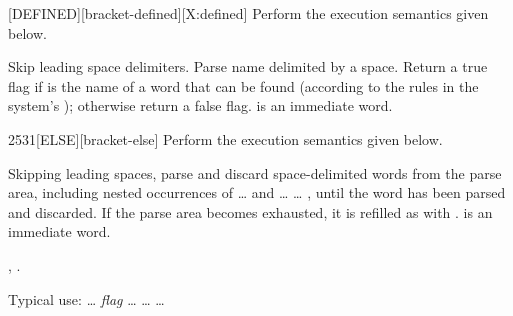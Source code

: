 
\begin{worddef}{}{[DEFINED]}[bracket-defined][X:defined]
\compile
	Perform the execution semantics given below.

\execute

	Skip leading space delimiters.  Parse name delimited by a space.
	Return a true flag if  is the name of a word that can
	be found (according to the rules in the system's );
	otherwise return a false flag.
	\word{[DEFINED]} is an immediate word.

	\begin{implement} %
		\word{:} \word{[DEFINED]}      \word{;} 
	\end{implement}
\end{worddef}


\begin{worddef}{2531}{[ELSE]}[bracket-else]
\compile
	Perform the execution semantics given below.

\execute

	Skipping leading spaces, parse and discard space-delimited words
	from the parse area, including nested occurrences of \word{[IF]}
	{\ldots} \word{[THEN]} and \word{[IF]} {\ldots} \word{[ELSE]}
	{\ldots} \linebreak \word{[THEN]}, until the word \word{[THEN]} has been
	parsed and discarded. If the parse area becomes exhausted, it is
	refilled as with . \word{[ELSE]} is an
	immediate word.

\see {},
	.

	\begin{rationale} %
		Typical use:
			{\ldots} \emph{flag}
			\word[tools]{[IF]} {\ldots}
			\word[tools]{[ELSE]} {\ldots}
			\word[tools]{[THEN]} {\ldots}
	\end{rationale}
\end{worddef}


